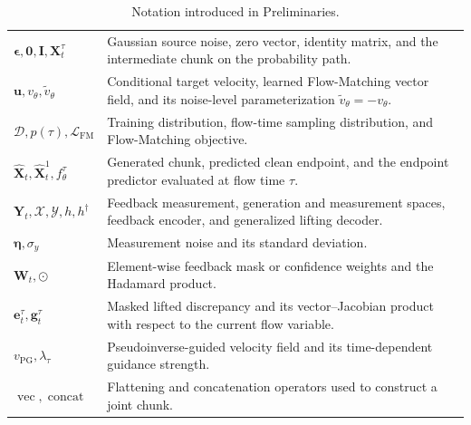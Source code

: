 \begin{table}[t]
\begin{tabular}{p{} p{}}
        $\boldsymbol{\epsilon},\mathbf{0},\mathbf{I},\mathbf{X}_t^\tau$
        & Gaussian source noise, zero vector, identity matrix, and the intermediate chunk on the probability path.\\
        $\mathbf{u},v_\theta,\tilde v_\theta$
        & Conditional target velocity, learned Flow-Matching vector field, and its noise-level parameterization $\tilde v_\theta=-v_\theta$.\\
        $\mathcal{D},p(\tau),\mathcal{L}_{\mathrm{FM}}$
        & Training distribution, flow-time sampling distribution, and Flow-Matching objective.\\
        $\hat{\mathbf{X}}_t,\hat{\mathbf{X}}_t^1,f_\theta^\tau$
        & Generated chunk, predicted clean endpoint, and the endpoint predictor evaluated at flow time $\tau$.\\
        $\mathbf{Y}_t,\mathcal{X},\mathcal{Y},h,h^\dagger$
        & Feedback measurement, generation and measurement spaces, feedback encoder, and generalized lifting decoder.\\
        $\boldsymbol{\eta},\sigma_y$
        & Measurement noise and its standard deviation.\\
        $\mathbf{W}_t,\odot$
        & Element-wise feedback mask or confidence weights and the Hadamard product.\\
        $\mathbf{e}_t^\tau,\mathbf{g}_t^\tau$
        & Masked lifted discrepancy and its vector--Jacobian product with respect to the current flow variable.\\
        $v_{\mathrm{PG}},\lambda_\tau$
        & Pseudoinverse-guided velocity field and its time-dependent guidance strength.\\
        $\operatorname{vec},\operatorname{concat}$
        & Flattening and concatenation operators used to construct a joint chunk.\\
        \hline
    \end{tabular}
    \caption{Notation introduced in Preliminaries.}
    \label{tab:preliminaries-notation}
\end{table}


